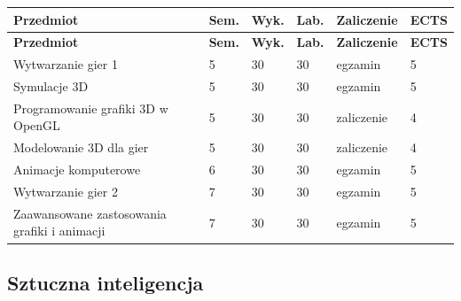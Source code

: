 \documentclass[12pt,a4paper]{article}
\newcommand{\thdrule}{\noalign{\global\setlength{\extrarowheight}{0pt}}}
\newcommand{\thdend}{\noalign{\global\setlength{\extrarowheight}{4pt}}}
\begin{document}
{\scriptsize
\begin{longtable}{m{6.5cm}m{0.7cm}m{1cm}m{1cm}m{1.7cm}m{0.7cm}}
\thdrule\toprule
\rowcolor{pjatkRed}
{\color{white}\footnotesize\textbf{\vphantom{Ag}Przedmiot}} & {\color{white}\footnotesize\textbf{\vphantom{Ag}Sem.}} & {\color{white}\footnotesize\textbf{\vphantom{Ag}Wyk.}} & {\color{white}\footnotesize\textbf{\vphantom{Ag}Lab.}} & {\color{white}\footnotesize\textbf{\vphantom{Ag}Zaliczenie}} & {\color{white}\footnotesize\textbf{\vphantom{Ag}ECTS}} \\
\midrule\thdend
\endfirsthead
\thdrule\toprule
\rowcolor{pjatkRed}
{\color{white}\footnotesize\textbf{\vphantom{Ag}Przedmiot}} & {\color{white}\footnotesize\textbf{\vphantom{Ag}Sem.}} & {\color{white}\footnotesize\textbf{\vphantom{Ag}Wyk.}} & {\color{white}\footnotesize\textbf{\vphantom{Ag}Lab.}} & {\color{white}\footnotesize\textbf{\vphantom{Ag}Zaliczenie}} & {\color{white}\footnotesize\textbf{\vphantom{Ag}ECTS}} \\
\midrule\thdend
\endhead
\rowcolor{tableRowLight} Wytwarzanie gier 1 & 5 & 30 & 30 & {\scriptsize egzamin} & 5 \\
\rowcolor{tableRowAlt} Symulacje 3D & 5 & 30 & 30 & {\scriptsize egzamin} & 5 \\
\rowcolor{tableRowLight} Programowanie grafiki 3D w OpenGL & 5 & 30 & 30 & {\scriptsize zaliczenie} & 4 \\
\rowcolor{tableRowAlt} Modelowanie 3D dla gier & 5 & 30 & 30 & {\scriptsize zaliczenie} & 4 \\
\rowcolor{tableRowLight} Animacje komputerowe & 6 & 30 & 30 & {\scriptsize egzamin} & 5 \\
\rowcolor{tableRowAlt} Wytwarzanie gier 2 & 7 & 30 & 30 & {\scriptsize egzamin} & 5 \\
\rowcolor{tableRowLight} Zaawansowane zastosowania grafiki i animacji & 7 & 30 & 30 & {\scriptsize egzamin} & 5 \\
\bottomrule
\end{longtable}}

\subsection*{Sztuczna inteligencja}
\end{document}
